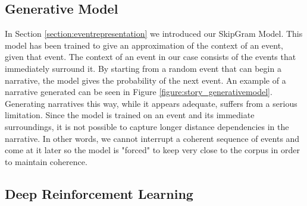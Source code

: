 \documentclass[11pt,letterpaper]{article}
\begin{document}
\subsection{Generative Model}

In Section \ref{section:eventrepresentation} we introduced our SkipGram Model. This model has been trained to give an approximation of the context of an event, given that event. The context of an event in our case consists of the events that immediately surround it. By starting from a random event that can begin a narrative, the model gives the probability of the next event. An example of a narrative generated can be seen in Figure \ref{figure:story_generativemodel}. Generating narratives this way, while it appears adequate, suffers from a serious limitation.  Since the model is trained on an event and its immediate surroundings, it is not possible to capture longer distance dependencies in the narrative. In other words, we cannot interrupt a coherent sequence of events and come at it later so the model is "forced" to keep very close to the corpus in order to maintain coherence. 

\subsection{Deep Reinforcement Learning}
\label{section:trainingtheagent}
\end{document}
